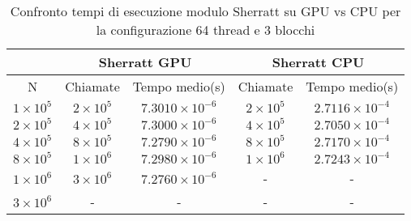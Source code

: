 \begin{table}[ht!]
    \begin{center}
        \renewcommand{\arraystretch}{1.5}
        \begin{adjustbox}{width=.65\textwidth}
            \begin{tabular}{ |c|c|c|c|c| }
                \hline
                \multicolumn{1}{|c}{} & \multicolumn{2}{|c}{Sherratt GPU} & \multicolumn{2}{|c|}{Sherratt CPU} \\
                \hline
                 N & Chiamate & Tempo medio(s) & Chiamate & Tempo medio(s) \\
                \hline 
                $1 \times 10^5$ & $2 \times 10^{5}$ & $7.3010 \times 10^{-6}$  & $2 \times 10^{5}$ & $2.7116 \times 10^{-4}$ \\ 
                \hline 
                $2 \times 10^5$ & $4 \times 10^{5}$ & $7.3000 \times 10^{-6}$  & $4 \times 10^{5}$ & $2.7050 \times 10^{-4}$ \\ 
                \hline 
                $4 \times 10^5$ & $8 \times 10^{5}$ & $7.2790 \times 10^{-6}$  & $8 \times 10^{5}$ & $2.7170 \times 10^{-4}$ \\ 
                \hline
                $8 \times 10^5$ & $1 \times 10^{6}$ & $7.2980 \times 10^{-6}$  & $1 \times 10^{6}$ & $2.7243 \times 10^{-4}$ \\ 
                \hline 
                $1 \times 10^6$ & $3 \times 10^{6}$ & $7.2760 \times 10^{-6}$  & - & - \\ 
                \hline 
                $3 \times 10^6$ & - & - & - & - \\ 
                \hline 
            \end{tabular}
        \end{adjustbox}
    \end{center}
    \caption{Confronto tempi di esecuzione modulo Sherratt su GPU vs CPU per la configurazione 64 thread e 3 blocchi}
    \label{tab:sherratt_kernel_table_64x3}
\end{table}


